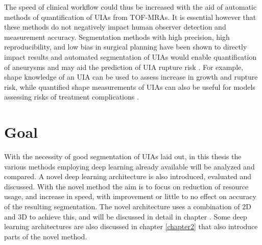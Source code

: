 The speed of clinical workflow could thus be increased with the aid of automatic methods of quantification of UIAs from TOF-MRAs. It is essential however that these methods do not negatively impact human observer detection and measurement accuracy. Segmentation methods with high precision, high reproducibility, and low bias in surgical planning have been shown to directly impact results and automated segmentation of UIAs would enable quantification of aneurysms and may aid the prediction of UIA rupture risk \cite{Taha2015} . For example, shape knowledge of an UIA can be used to assess increase in growth and rupture risk, while quantified shape measurements of UIAs can also be useful for models assessing risks of treatment complications \cite{backes2017elapss, ji2016risk}.


\section{Goal}
With the necessity of good segmentation of UIAs laid out, in this thesis the various methods employing deep learning already available will be analyzed and compared. A novel deep learning architecture is also introduced, evaluated and discussed. With the novel method the aim is to focus on reduction of resource usage, and increase in speed, with improvement or little to no effect on accuracy of the resulting segmentation. The novel architecture uses a combination of 2D and 3D to achieve this, and will be discussed in detail in chapter . Some deep learning architectures are also discussed in chapter \ref{chapter2} that also introduce parts of the novel method. 







